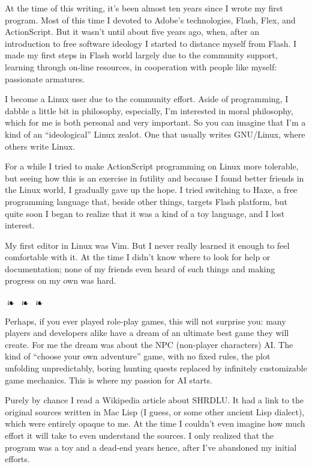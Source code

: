 \documentclass[oneside]{memoir}
\begin{document}
At the time of this writing, it's been almost ten years since I wrote my first
program.  Most of this time I devoted to Adobe's technologies, Flash, Flex,
and ActionScript.  But it wasn't until about five years ago, when, after an
introduction to free software ideology I started to distance myself from
Flash.  I made my first steps in Flash world largely due to the community
support, learning through on-line resources, in cooperation with people like
myself: passionate armatures.

I become a Linux user due to the community effort.  Aside of programming, I
dabble a little bit in philosophy, especially, I'm interested in moral
philosophy, which for me is both personal and very important.  So you can
imagine that I'm a kind of an ``ideological'' Linux zealot.  One that usually
writes GNU/Linux, where others write Linux.

For a while I tried to make ActionScript programming on Linux more tolerable,
but seeing how this is an exercise in futility and because I found better
friends in the Linux world, I gradually gave up the hope.  I tried switching
to Haxe, a free programming language that, beside other things, targets Flash
platform, but quite soon I began to realize that it was a kind of a toy
language, and I lost interest.

My first editor in Linux was Vim.  But I never really learned it enough to
feel comfortable with it.  At the time I didn't know where to look for help or
documentation; none of my friends even heard of such things and making
progress on my own was hard.

\noindent\hrulefill\hspace{0.2cm}
$\mathrel{
  \raisebox{-2pt}{
    \ding{167} \;
    \ding{167} \;
    \ding{167}}}$
\hspace{0.2cm} \hrulefill

Perhaps, if you ever played role-play games, this will not surprise you: many
players and developers alike have a dream of an ultimate best game they will
create.  For me the dream was about the NPC (non-player characters) AI.  The
kind of ``choose your own adventure'' game, with no fixed rules, the plot
unfolding unpredictably, boring hunting quests replaced by infinitely
customizable game mechanics.  This is where my passion for AI starts.

Purely by chance I read a Wikipedia article about SHRDLU.  It had a link to
the original sources written in Mac Lisp (I guess, or some other ancient Lisp
dialect), which were entirely opaque to me.  At the time I couldn't even
imagine how much effort it will take to even understand the sources.  I only
realized that the program was a toy and a dead-end years hence, after I've
abandoned my initial efforts.
\end{document}
